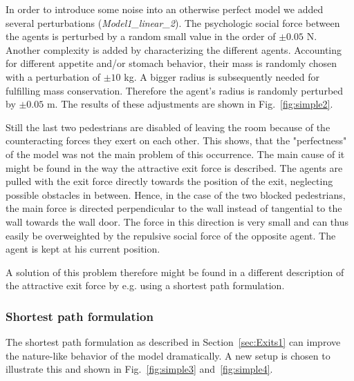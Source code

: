 \documentclass[11pt]{article}
\begin{document}
In order to introduce some noise into an otherwise perfect model we added several perturbations ({\it Model1\_linear\_2}). The psychologic social force between the agents is perturbed by a random small value in the order of $\pm 0.05$ N. Another complexity is added by characterizing the different agents. Accounting for different appetite and/or stomach behavior, their mass is randomly chosen with a perturbation of $\pm 10$ kg. A bigger radius is subsequently needed for fulfilling mass conservation. Therefore the agent's radius is randomly perturbed by $\pm 0.05$ m. The results of these adjustments are shown in Fig.~\ref{fig:simple2}.

Still the last two pedestrians are disabled of leaving the room because of the counteracting forces they exert on each other. This shows, that the "perfectness" of the model was not the main problem of this occurrence. The main cause of it might be found in the way the attractive exit force is described. The agents are pulled with the exit force directly towards the position of the exit, neglecting possible obstacles in between. Hence, in the case of the two blocked pedestrians, the main force is directed perpendicular to the wall instead of tangential to the wall towards the wall door. The force in this direction is very small and can thus easily be overweighted by the repulsive social force of the opposite agent. The agent is kept at his current position.

A solution of this problem therefore might be found in a different description of the attractive exit force by e.g. using a shortest path formulation.

\subsubsection{Shortest path formulation}

The shortest path formulation as described in Section~\ref{sec:Exits1} can improve the nature-like behavior of the model dramatically. A new setup is chosen to illustrate this and shown in Fig.~\ref{fig:simple3} and~\ref{fig:simple4}.
\end{document}
